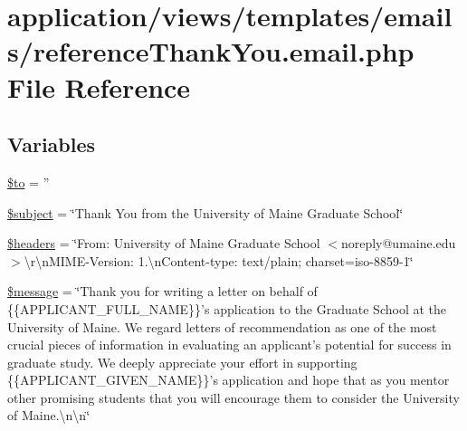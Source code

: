 \hypertarget{reference_thank_you_8email_8php}{\section{application/views/templates/emails/reference\-Thank\-You.email.\-php File Reference}
\label{reference_thank_you_8email_8php}
}
\subsection*{Variables}
\begin{DoxyCompactItemize}
\item 
\hyperlink{reference_thank_you_8email_8php_ac19f839b525d6d99d063fe56bf2a6d3b}{\$to} = ''
\item 
\hyperlink{reference_thank_you_8email_8php_afea90503726cd5ad2eb80baf0b6d217d}{\$subject} = \char`\"{}Thank You from the University of Maine Graduate School\char`\"{}
\item 
\hyperlink{reference_thank_you_8email_8php_a52500036ee807241b8b4b7e2367c49ef}{\$headers} = \char`\"{}From\-: University of Maine Graduate School $<$noreply@umaine.\-edu$>$\textbackslash{}r\textbackslash{}n\-M\-I\-M\-E-\/Version\-: 1.\textbackslash{}n\-Content-\/type\-: text/plain; charset=iso-\/8859-\/1\char`\"{}
\item 
\hyperlink{reference_thank_you_8email_8php_abf17cb2dba2ed17cb28aa5f37deb5293}{\$message} = \char`\"{}Thank you for writing a letter on behalf of \{\{A\-P\-P\-L\-I\-C\-A\-N\-T\-\_\-\-F\-U\-L\-L\-\_\-\-N\-A\-M\-E\}\}'s application to the Graduate School at the University of Maine. We regard letters of recommendation as one of the most crucial pieces of information in evaluating an applicant's potential for success in graduate study. We deeply appreciate your effort in supporting \{\{A\-P\-P\-L\-I\-C\-A\-N\-T\-\_\-\-G\-I\-V\-E\-N\-\_\-\-N\-A\-M\-E\}\}'s application and hope that as you mentor other promising students that you will encourage them to consider the University of Maine.\textbackslash{}n\textbackslash{}n\char`\"{}
\end{DoxyCompactItemize}


